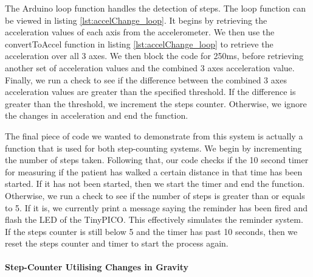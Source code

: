 {

The Arduino loop function handles the detection of steps. The loop function can be viewed in listing \ref{lst:accelChange_loop}. It begins by retrieving the acceleration values of each axis from the accelerometer. We then use the convertToAccel function in listing \ref{lst:accelChange_loop} to retrieve the acceleration over all 3 axes. We then block the code for 250ms, before retrieving another set of acceleration values and the combined 3 axes acceleration value. Finally, we run a check to see if the difference between the combined 3 axes acceleration values are greater than the specified threshold. If the difference is greater than the threshold, we increment the steps counter. Otherwise, we ignore the changes in acceleration and end the function.



The final piece of code we wanted to demonstrate from this system is actually a function that is used for both step-counting systems. We begin by incrementing the number of steps taken. Following that, our code checks if the 10 second timer for measuring if the patient has walked a certain distance in that time has been started. If it has not been started, then we start the timer and end the function. Otherwise, we run a check to see if the number of steps is greater than or equals to 5. If it is, we currently print a message saying the reminder has been fired and flash the LED of the TinyPICO. This effectively simulates the reminder system. If the steps counter is still below 5 and the timer has past 10 seconds, then we reset the steps counter and timer to start the process again.




\paragraph{Step-Counter Utilising Changes in Gravity}

}
